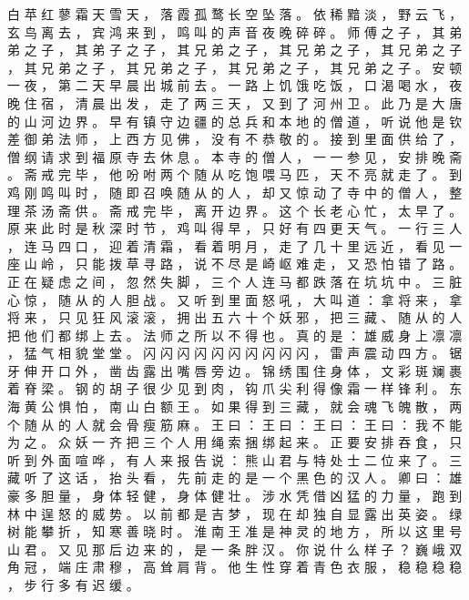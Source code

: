 {白 苹 红 蓼 霜 天 雪 天 ， 落 霞 孤 鹜 长 空 坠 落 。
依 稀 黯 淡 ， 野 云 飞 ， 玄 鸟 离 去 ， 宾 鸿 来 到 ， 鸣 叫 的 声 音 夜 晚 碎 碎 。
师 傅 之 子 ， 其 弟 弟 之 子 ， 其 弟 子 之 子 ， 其 兄 弟 之 子 ， 其 兄 弟 之 子 ， 其 兄 弟 之 子 ， 其 兄 弟 之 子 ， 其 兄 弟 之 子 ， 其 兄 弟 之 子 ， 其 兄 弟 之 子 。
安 顿 一 夜 ， 第 二 天 早 晨 出 城 前 去 。
一 路 上 饥 饿 吃 饭 ， 口 渴 喝 水 ， 夜 晚 住 宿 ， 清 晨 出 发 ， 走 了 两 三 天 ， 又 到 了 河 州 卫 。
此 乃 是 大 唐 的 山 河 边 界 。
早 有 镇 守 边 疆 的 总 兵 和 本 地 的 僧 道 ， 听 说 他 是 钦 差 御 弟 法 师 ， 上 西 方 见 佛 ， 没 有 不 恭 敬 的 。
接 到 里 面 供 给 了 ， 僧 纲 请 求 到 福 原 寺 去 休 息 。
本 寺 的 僧 人 ， 一 一 参 见 ， 安 排 晚 斋 。
斋 戒 完 毕 ， 他 吩 咐 两 个 随 从 吃 饱 喂 马 匹 ， 天 不 亮 就 走 了 。
到 鸡 刚 鸣 叫 时 ， 随 即 召 唤 随 从 的 人 ， 却 又 惊 动 了 寺 中 的 僧 人 ， 整 理 茶 汤 斋 供 。
斋 戒 完 毕 ， 离 开 边 界 。
这 个 长 老 心 忙 ， 太 早 了 。
原 来 此 时 是 秋 深 时 节 ， 鸡 叫 得 早 ， 只 好 有 四 更 天 气 。
一 行 三 人 ， 连 马 四 口 ， 迎 着 清 霜 ， 看 着 明 月 ， 走 了 几 十 里 远 近 ， 看 见 一 座 山 岭 ， 只 能 拨 草 寻 路 ， 说 不 尽 是 崎 岖 难 走 ， 又 恐 怕 错 了 路 。
正 在 疑 虑 之 间 ， 忽 然 失 脚 ， 三 个 人 连 马 都 跌 落 在 坑 坑 中 。
三 脏 心 惊 ， 随 从 的 人 胆 战 。
又 听 到 里 面 怒 吼 ， 大 叫 道 ： 拿 将 来 ， 拿 将 来 ， 只 见 狂 风 滚 滚 ， 拥 出 五 六 十 个 妖 邪 ， 把 三 藏 、 随 从 的 人 把 他 们 都 绑 上 去 。
法 师 之 所 以 不 得 也 。
真 的 是 ： 雄 威 身 上 凛 凛 ， 猛 气 相 貌 堂 堂 。
闪 闪 闪 闪 闪 闪 闪 闪 闪 闪 ， 雷 声 震 动 四 方 。
锯 牙 伸 开 口 外 ， 凿 齿 露 出 嘴 唇 旁 边 。
锦 绣 围 住 身 体 ， 文 彩 斑 斓 裹 着 脊 梁 。
钢 的 胡 子 很 少 见 到 肉 ， 钩 爪 尖 利 得 像 霜 一 样 锋 利 。
东 海 黄 公 惧 怕 ， 南 山 白 额 王 。
如 果 得 到 三 藏 ， 就 会 魂 飞 魄 散 ， 两 个 随 从 的 人 就 会 骨 瘦 筋 麻 。
王 曰 ： 王 曰 ： 王 曰 ： 王 曰 ： 我 不 能 为 之 。
众 妖 一 齐 把 三 个 人 用 绳 索 捆 绑 起 来 。
正 要 安 排 吞 食 ， 只 听 到 外 面 喧 哗 ， 有 人 来 报 告 说 ： 熊 山 君 与 特 处 士 二 位 来 了 。
三 藏 听 了 这 话 ， 抬 头 看 ， 先 前 走 的 是 一 个 黑 色 的 汉 人 。
卿 曰 ： 雄 豪 多 胆 量 ， 身 体 轻 健 ， 身 体 健 壮 。
涉 水 凭 借 凶 猛 的 力 量 ， 跑 到 林 中 逞 怒 的 威 势 。
以 前 都 是 吉 梦 ， 现 在 却 独 自 显 露 出 英 姿 。
绿 树 能 攀 折 ， 知 寒 善 晓 时 。
淮 南 王 准 是 神 灵 的 地 方 ， 所 以 这 里 号 山 君 。
又 见 那 后 边 来 的 ， 是 一 条 胖 汉 。
你 说 什 么 样 子 ？ 巍 峨 双 角 冠 ， 端 庄 肃 穆 ， 高 耸 肩 背 。
他 生 性 穿 着 青 色 衣 服 ， 稳 稳 稳 稳 ， 步 行 多 有 迟 缓 。
}
